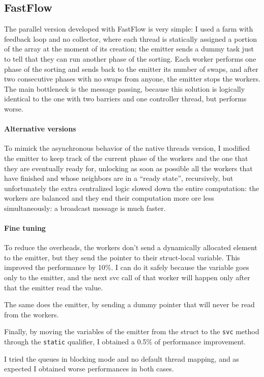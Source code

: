 \subsection{FastFlow}
The parallel version developed with FastFlow is very simple: I used a farm with feedback loop and no collector, where each thread is statically assigned a portion of the array at the moment of its creation; the emitter sends a dummy task just to tell that they can run another phase of the sorting. Each worker performs one phase of the sorting and sends back to the emitter its number of swaps, and after two consecutive phases with no swaps from anyone, the emitter stops the workers. The main bottleneck is the message passing, because this solution is logically identical to the one with two barriers and one controller thread, but performs worse.

\paragraph{Alternative versions}
To mimick the asynchronous behavior of the native threads version, I modified the emitter to keep track of the current phase of the workers and the one that they are eventually ready for, unlocking as soon as possible all the workers that have finished and whose neighbors are in a ``ready state'', recursively, but unfortunately the extra centralized logic slowed down the entire computation: the workers are balanced and they end their computation more ore less simultaneously: a broadcast message is much faster.

\paragraph{Fine tuning}
To reduce the overheads, the workers don't send a dynamically allocated element to the emitter, but they send the pointer to their struct-local variable. This improved the performance by 10\%. I can do it safely because the variable goes only to the emitter, and the next svc call of that worker will happen only after that the emitter read the value.

The same does the emitter, by sending a dummy pointer that will never be read from the workers.

Finally, by moving the variables of the emitter from the struct to the \texttt{svc} method through the \texttt{static} qualifier, I obtained a 0.5\% of performance improvement.

I tried the queues in blocking mode and no default thread mapping, and as expected I obtained worse performances in both cases.
\bigbreak

